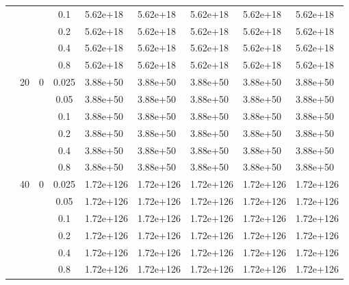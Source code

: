 \begin{longtable}{|l|l|l|c|l|l|l|l|l|}
\cmidrule{4-9} &     &          & 0.1            & 5.62e+18   & 5.62e+18   & 5.62e+18   & 5.62e+18   & 5.62e+18   \\
\cmidrule{4-9} &     &          & 0.2            & 5.62e+18   & 5.62e+18   & 5.62e+18   & 5.62e+18   & 5.62e+18   \\
\cmidrule{4-9} &     &          & 0.4            & 5.62e+18   & 5.62e+18   & 5.62e+18   & 5.62e+18   & 5.62e+18   \\
\cmidrule{4-9} &     &          & 0.8            & 5.62e+18   & 5.62e+18   & 5.62e+18   & 5.62e+18   & 5.62e+18   \\
\cmidrule{2-9} & 20  & 0        & 0.025          & 3.88e+50   & 3.88e+50   & 3.88e+50   & 3.88e+50   & 3.88e+50   \\
\cmidrule{4-9} &     &          & 0.05           & 3.88e+50   & 3.88e+50   & 3.88e+50   & 3.88e+50   & 3.88e+50   \\
\cmidrule{4-9} &     &          & 0.1            & 3.88e+50   & 3.88e+50   & 3.88e+50   & 3.88e+50   & 3.88e+50   \\
\cmidrule{4-9} &     &          & 0.2            & 3.88e+50   & 3.88e+50   & 3.88e+50   & 3.88e+50   & 3.88e+50   \\
\cmidrule{4-9} &     &          & 0.4            & 3.88e+50   & 3.88e+50   & 3.88e+50   & 3.88e+50   & 3.88e+50   \\
\cmidrule{4-9} &     &          & 0.8            & 3.88e+50   & 3.88e+50   & 3.88e+50   & 3.88e+50   & 3.88e+50   \\
\cmidrule{2-9} & 40  & 0        & 0.025          & 1.72e+126  & 1.72e+126  & 1.72e+126  & 1.72e+126  & 1.72e+126  \\
\cmidrule{4-9} &     &          & 0.05           & 1.72e+126  & 1.72e+126  & 1.72e+126  & 1.72e+126  & 1.72e+126  \\
\cmidrule{4-9} &     &          & 0.1            & 1.72e+126  & 1.72e+126  & 1.72e+126  & 1.72e+126  & 1.72e+126  \\
\cmidrule{4-9} &     &          & 0.2            & 1.72e+126  & 1.72e+126  & 1.72e+126  & 1.72e+126  & 1.72e+126  \\
\cmidrule{4-9} &     &          & 0.4            & 1.72e+126  & 1.72e+126  & 1.72e+126  & 1.72e+126  & 1.72e+126  \\
\cmidrule{4-9} &     &          & 0.8            & 1.72e+126  & 1.72e+126  & 1.72e+126  & 1.72e+126  & 1.72e+126  \\ 

\end{longtable}
